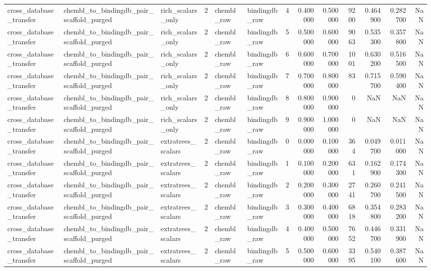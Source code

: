 \begin{longtable}{lllrllrrrrrrr}
cross\_database\_transfer & chembl\_to\_bindingdb\_pair\_scaffold\_purged & rich\_scalars\_only & 2 & chembl\_raw & bindingdb\_raw & 4 & 0.400000 & 0.500000 & 9200 & 0.464900 & 0.282700 & NaN \\
cross\_database\_transfer & chembl\_to\_bindingdb\_pair\_scaffold\_purged & rich\_scalars\_only & 2 & chembl\_raw & bindingdb\_raw & 5 & 0.500000 & 0.600000 & 9063 & 0.535300 & 0.357800 & NaN \\
cross\_database\_transfer & chembl\_to\_bindingdb\_pair\_scaffold\_purged & rich\_scalars\_only & 2 & chembl\_raw & bindingdb\_raw & 6 & 0.600000 & 0.700000 & 1001 & 0.630200 & 0.516500 & NaN \\
cross\_database\_transfer & chembl\_to\_bindingdb\_pair\_scaffold\_purged & rich\_scalars\_only & 2 & chembl\_raw & bindingdb\_raw & 7 & 0.700000 & 0.800000 & 83 & 0.715700 & 0.590400 & NaN \\
cross\_database\_transfer & chembl\_to\_bindingdb\_pair\_scaffold\_purged & rich\_scalars\_only & 2 & chembl\_raw & bindingdb\_raw & 8 & 0.800000 & 0.900000 & 0 & NaN & NaN & NaN \\
cross\_database\_transfer & chembl\_to\_bindingdb\_pair\_scaffold\_purged & rich\_scalars\_only & 2 & chembl\_raw & bindingdb\_raw & 9 & 0.900000 & 1.000000 & 0 & NaN & NaN & NaN \\
cross\_database\_transfer & chembl\_to\_bindingdb\_pair\_scaffold\_purged & extratrees\_scalars & 2 & chembl\_raw & bindingdb\_raw & 0 & 0.000000 & 0.100000 & 364 & 0.049700 & 0.011000 & NaN \\
cross\_database\_transfer & chembl\_to\_bindingdb\_pair\_scaffold\_purged & extratrees\_scalars & 2 & chembl\_raw & bindingdb\_raw & 1 & 0.100000 & 0.200000 & 631 & 0.162900 & 0.174300 & NaN \\
cross\_database\_transfer & chembl\_to\_bindingdb\_pair\_scaffold\_purged & extratrees\_scalars & 2 & chembl\_raw & bindingdb\_raw & 2 & 0.200000 & 0.300000 & 2741 & 0.260700 & 0.241500 & NaN \\
cross\_database\_transfer & chembl\_to\_bindingdb\_pair\_scaffold\_purged & extratrees\_scalars & 2 & chembl\_raw & bindingdb\_raw & 3 & 0.300000 & 0.400000 & 6818 & 0.354800 & 0.283200 & NaN \\
cross\_database\_transfer & chembl\_to\_bindingdb\_pair\_scaffold\_purged & extratrees\_scalars & 2 & chembl\_raw & bindingdb\_raw & 4 & 0.400000 & 0.500000 & 7652 & 0.446700 & 0.331900 & NaN \\
cross\_database\_transfer & chembl\_to\_bindingdb\_pair\_scaffold\_purged & extratrees\_scalars & 2 & chembl\_raw & bindingdb\_raw & 5 & 0.500000 & 0.600000 & 3395 & 0.540100 & 0.387600 & NaN \\

\end{longtable}
